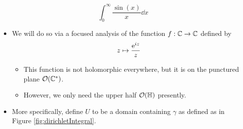\documentclass[../notes.tex]{subfiles}
\begin{document}
\begin{itemize}
    \begin{equation*}
        \int_0^\infty\frac{\sin(x)}{x}\dd{x}
    \end{equation*}
    \begin{itemize}
        \item We will do so via a focused analysis of the function $f:\C\to\C$ defined by
        \begin{equation*}
            z \mapsto \frac{\e[iz]}{z}
        \end{equation*}
        \begin{itemize}
            \item This function is not holomorphic everywhere, but it is on the punctured plane $\mathcal{O}(\C^*)$.
            \item However, we only need the upper half $\mathcal{O}(\Hh)$ presently.
        \end{itemize}
        \item More specifically, define $U$ to be a domain containing $\gamma$ as defined as in Figure \ref{fig:dirichletIntegral}.
        \begin{figure}[H]
            \centering
\end{figure}
\end{itemize}
\end{itemize}
\end{document}
